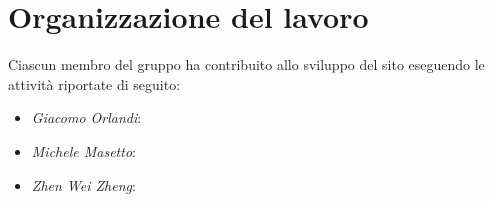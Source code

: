 \section{Organizzazione del lavoro}
Ciascun membro del gruppo ha contribuito allo sviluppo del sito eseguendo le
attività riportate di seguito:
\begin{itemize}
	\item \textit{Giacomo Orlandi}:

	\item \textit{Michele Masetto}:

	\item \textit{Zhen Wei Zheng}:

\end{itemize}